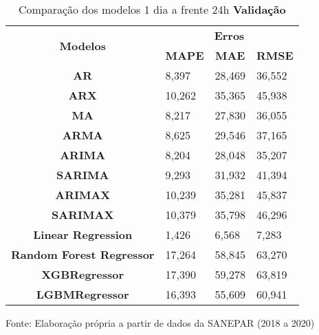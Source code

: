 \begin{table}[H]
	\centering
	\caption{Comparação dos modelos 1 dia a frente 24h \textbf{Validação} }\label{tb:1-24vld}
	\begin{tabular}{@{}clll@{}}
		\toprule
		\multirow{2}{*}{\textbf{Modelos}} & \multicolumn{3}{c}{\textbf{Erros}}                                                                       \\ \cmidrule(l){2-4} 
		& \multicolumn{1}{c}{\textbf{MAPE}} & \multicolumn{1}{c}{\textbf{MAE}} & \multicolumn{1}{c}{\textbf{RMSE}} \\ \hline
\textbf{AR}                       & 8,397                             & 28,469                           & 36,552                            \\
\textbf{ARX}                      & 10,262                            & 35,365                           & 45,938                            \\
\textbf{MA}                       & 8,217                             & 27,830                           & 36,055                            \\
\textbf{ARMA}                     & 8,625                             & 29,546                           & 37,165                            \\
\textbf{ARIMA}                    & 8,204                             & 28,048                           & 35,207                            \\
\textbf{SARIMA}                   & 9,293                             & 31,932                           & 41,394                            \\
\textbf{ARIMAX}                   & 10,239                            & 35,281                           & 45,837                            \\
\textbf{SARIMAX}                  & 10,379                            & 35,798                           & 46,296                            \\
\textbf{Linear Regression}        & 1,426                             & 6,568                            & 7,283                             \\
\textbf{Random Forest Regressor}  & 17,264                            & 58,845                           & 63,270                            \\
\textbf{XGBRegressor}             & 17,390                            & 59,278                           & 63,819                            \\
\textbf{LGBMRegressor}            & 16,393                            & 55,609                           & 60,941                            \\ \bottomrule
	\end{tabular}

Fonte: Elaboração própria a partir de dados da SANEPAR (2018 a 2020)
\end{table}

